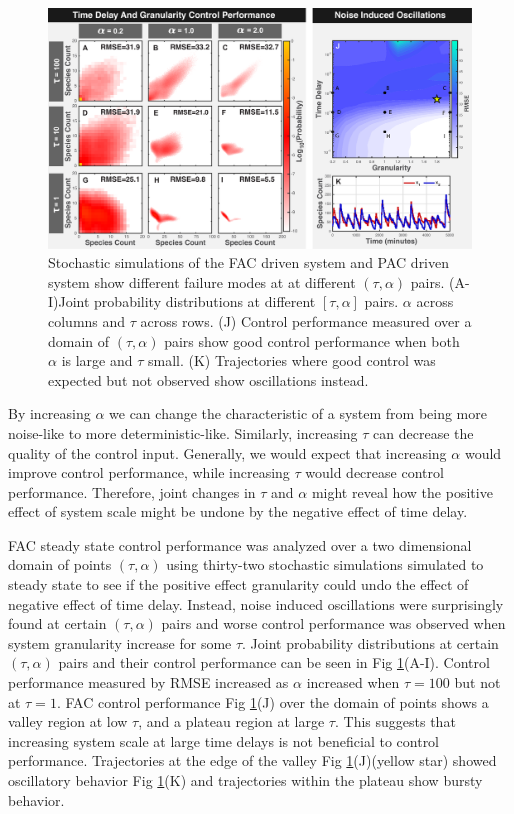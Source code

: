 \documentclass[12pt]{iopart}
\begin{document}
\begin{figure}
\begin{center}
\includegraphics[width=1\textwidth]{DelayAndGranularity.pdf}
\vspace{-0.1in}
\caption{Stochastic simulations of the FAC driven system and PAC driven system show different failure modes at at different $(\tau,\alpha)$ pairs. (A-I)Joint probability distributions at different $[\tau,\alpha]$ pairs. $\alpha$ across columns and $\tau$ across rows. (J) Control performance measured over a domain of $(\tau,\alpha)$ pairs show good control performance when both $\alpha$ is large and $\tau$ small. (K) Trajectories where good control was expected but not observed show oscillations instead.}
\label{DG}
\end{center}
\vspace{-0.2in}
\end{figure}

By increasing $\alpha$ we can change the characteristic of a system from being more noise-like to more deterministic-like. Similarly, increasing $\tau$ can decrease the quality of the control input. Generally, we would expect that increasing $\alpha$ would improve control performance, while increasing $\tau$ would decrease control performance. Therefore, joint changes in $\tau$ and $\alpha$ might reveal how the positive effect of system scale might be undone by the negative effect of time delay.

FAC steady state control performance was analyzed over a two dimensional domain of points $(\tau,\alpha)$ using thirty-two stochastic simulations simulated to steady state to see if the positive effect granularity could undo the effect of negative effect of time delay. Instead, noise induced oscillations were surprisingly found at certain $(\tau,\alpha)$ pairs and worse control performance was observed when system granularity increase for some $\tau$.  Joint probability distributions at certain $(\tau,\alpha)$ pairs and their control performance can be seen in Fig \ref{DG}(A-I). Control performance measured by RMSE increased as $\alpha$ increased when $\tau=100$ but not at $\tau=1$. FAC control performance Fig \ref{DG}(J) over the domain of points shows a valley region at low $\tau$, and a plateau region at large $\tau$. This suggests that increasing system scale at large time delays is not beneficial to control performance.  Trajectories at the edge of the valley Fig \ref {DG}(J)(yellow star) showed oscillatory behavior Fig \ref {DG}(K) and trajectories within the plateau show bursty behavior. 
\end{document}
